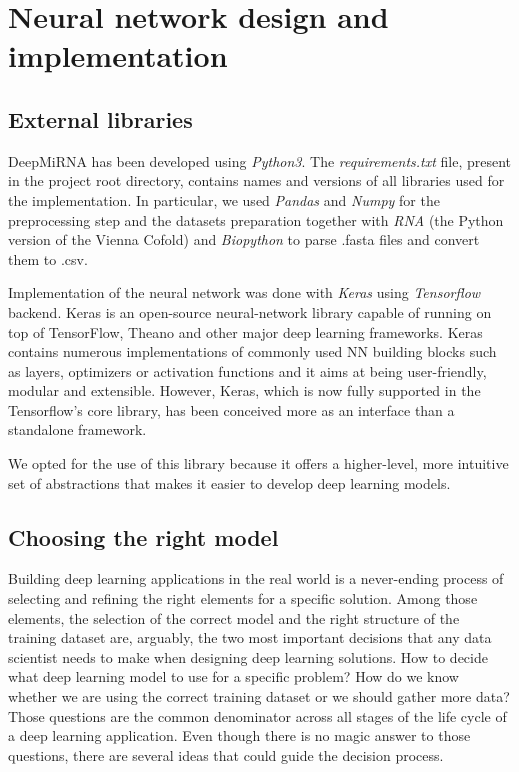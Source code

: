 
\chapter{Neural network design and implementation} %

\label{Chapter5} %

\section{External libraries}
DeepMiRNA has been developed using \emph{Python3}. The \emph{requirements.txt} file, present in the project root directory, contains names and versions of all libraries used for the implementation. In particular, we used \emph{Pandas} and \emph{Numpy} for the preprocessing step and the datasets preparation together with \emph{RNA} (the Python version of the Vienna Cofold) and \emph{Biopython} to parse .fasta files and convert them to .csv. 

Implementation of the neural network was done with \emph{Keras}\cite{keras} using \emph{Tensorflow} backend\cite{tensorflow}. Keras is an open-source neural-network library capable of running on top of TensorFlow, Theano and other major deep learning frameworks. Keras contains numerous implementations of commonly used NN building blocks such as layers, optimizers or activation functions and it aims at being user-friendly, modular and extensible. However, Keras, which is now fully supported in the Tensorflow's core library, has been conceived more as an interface than a standalone framework. 

We opted for the use of this library because it offers a higher-level, more intuitive set of abstractions that makes it easier to develop deep learning models.    

\section{Choosing the right model}
Building deep learning applications in the real world is a never-ending process of selecting and refining the right elements for a specific solution. Among those elements, the selection of the correct model and the right structure of the training dataset are, arguably, the two most important decisions that any data scientist needs to make when designing deep learning solutions. How to decide what deep learning model to use for a specific problem? How do we know whether we are using the correct training dataset or we should gather more data? Those questions are the common denominator across all stages of the life cycle of a deep learning application. Even though there is no magic answer to those questions, there are several ideas that could guide the decision process. 

